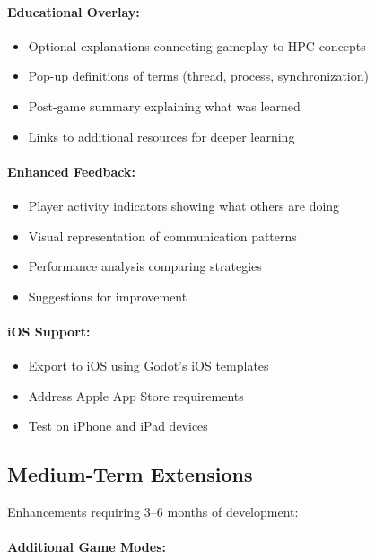 \paragraph*{Educational Overlay:}
\begin{itemize}
    \item Optional explanations connecting gameplay to HPC concepts
    \item Pop-up definitions of terms (thread, process, synchronization)
    \item Post-game summary explaining what was learned
    \item Links to additional resources for deeper learning
\end{itemize}

\paragraph*{Enhanced Feedback:}
\begin{itemize}
    \item Player activity indicators showing what others are doing
    \item Visual representation of communication patterns
    \item Performance analysis comparing strategies
    \item Suggestions for improvement
\end{itemize}

\paragraph*{iOS Support:}
\begin{itemize}
    \item Export to iOS using Godot's iOS templates
    \item Address Apple App Store requirements
    \item Test on iPhone and iPad devices
\end{itemize}

\subsection{Medium-Term Extensions}
\label{subsec:medium-term-extensions}

Enhancements requiring 3--6 months of development:

\paragraph*{Additional Game Modes:}

